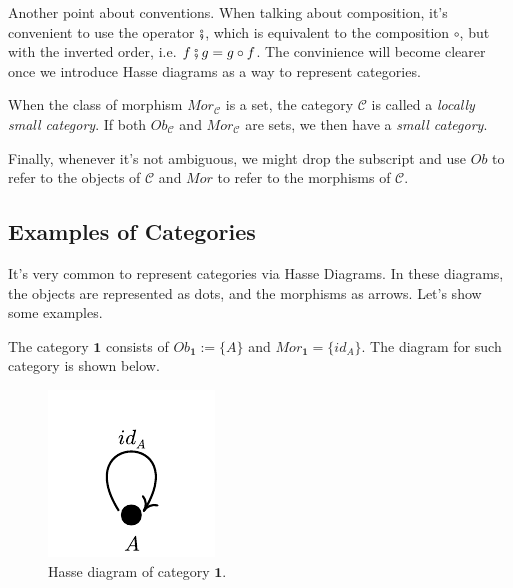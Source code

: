 Another point about conventions. When talking about composition, it's convenient
to use the operator $\fatsemi$, which is equivalent to the composition $\circ$,
but with the inverted order, i.e. $f \fatsemi g = g \circ f$. The convinience
will become clearer once we introduce Hasse diagrams as a way to represent categories.

When the class of morphism $Mor_\mathcal C$ is a set, the category $\mathcal C$ is called
a \textit{locally small category}. If both $Ob_\mathcal C$ and $Mor_\mathcal C$ are sets,
we then have a \textit{small category}.

Finally, whenever it's not ambiguous, we might drop the subscript and use $Ob$
to refer to the objects of $\mathcal C$ and $Mor$ to refer to the morphisms of $\mathcal C$.

\subsection{Examples of Categories}

It's very common to represent categories via Hasse Diagrams. In these diagrams, the
objects are represented as dots, and the morphisms as arrows. Let's show some examples.

\begin{example}[Category $\bm 1$]
  The category $\bm 1$ consists of $Ob_{\bm 1} := \{A\}$ and $Mor_{\bm 1} = \{id_A\}$.
  The diagram for such category is shown below.
  \begin{figure}[H]
    \begin{center}
      \includegraphics{./notebooks/1Cat}
    \end{center}
    \caption{Hasse diagram of category $\bm 1$.}
    \label{fig:1Cat}
  \end{figure}
\end{example}

